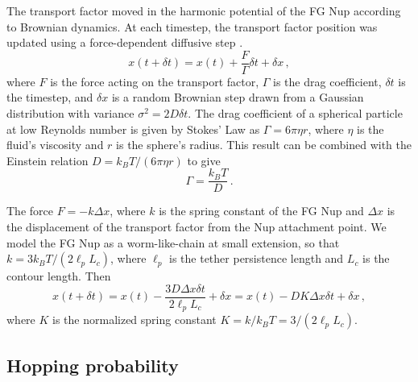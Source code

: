 The transport factor moved in the harmonic potential of the FG Nup according to Brownian dynamics. At each timestep, the transport factor position was updated using a force-dependent diffusive step \cite{blackwell17}.
\begin{equation}
  x(t+\delta t) = x(t) + \frac{F}{\Gamma} \delta t + \delta x\,,
\end{equation} 
where $F$ is the force acting on the transport factor, $\Gamma$ is the drag coefficient, $\delta t$ is the timestep, and $\delta x$ is a random Brownian step drawn from a Gaussian distribution with variance $\sigma^2 = 2 D \delta t$. The drag coefficient of a spherical particle at low Reynolds number is given by Stokes' Law as $\Gamma = 6 \pi \eta r$, where $\eta$ is the fluid's viscosity and $r$ is the sphere's radius.  This result can be combined with the Einstein relation $D = k_B T / (6\pi \eta r)$ to give
\begin{equation}
\Gamma= \frac{k_B T}{D}\,.
\end{equation}
 
The force $F = -k\Delta x$, where $k$ is the spring constant of the FG Nup and $\Delta x$ is the displacement of the transport factor from the Nup attachment point.  We model the FG Nup as a worm-like-chain at small extension, so that $k = 3 k_B T/(2\ell_pL_c)$, where $\ell_p$ is the tether persistence length and $L_c$ is the contour length.  Then 
\begin{equation}
  x(t+\delta t) = x(t) - \frac{3 D \Delta x \delta t}{2\ell_p L_c }+
  \delta x = x(t) - D K \Delta x \delta t+ \delta x\,,
\end{equation}
where $K$ is the normalized spring constant $K = k/k_B T = 3/(2 \ell_p L_c)$.

\subsection{Hopping probability}

